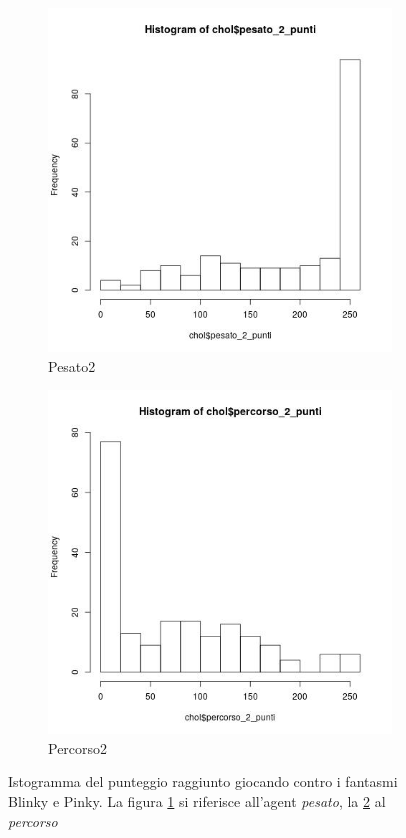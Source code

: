 \documentclass[8pt]{book}
\begin{document}
\begin{figure}
  \centering
  \begin{subfigure}[b]{0.49\textwidth}
    \includegraphics[width=\textwidth]{img/pesato_2_punteggio.png}
    \caption{Pesato2}
    \label{Pesato2}
   \end{subfigure}
  \begin{subfigure}[b]{0.49\textwidth}
    \includegraphics[width=\textwidth]{img/percorso_2_punteggio.png}
    \caption{Percorso2}
    \label{Percorso2}
  \end{subfigure}
  \caption{Istogramma del punteggio raggiunto giocando contro  i fantasmi Blinky e Pinky. La figura \ref{Pesato2} si riferisce all'agent \emph{pesato}, la \ref{Percorso2} al \emph{percorso}}
  \label{pesatoPercorso2}
\end{figure}
\end{document}
